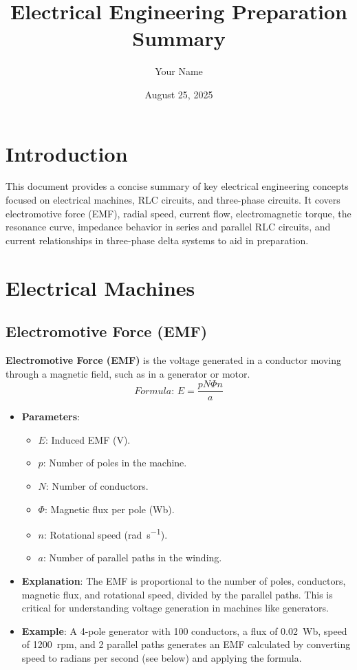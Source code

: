 \documentclass[12pt]{article}
\newcommand{\concept}[1]{\textbf{#1}}
\newcommand{\formula}[1]{\textit{Formula: }#1}
\begin{document}
\title{Electrical Engineering Preparation Summary}
\author{Your Name}
\date{August 25, 2025}
\maketitle

\tableofcontents
\newpage

\section{Introduction}
This document provides a concise summary of key electrical engineering concepts focused on electrical machines, RLC circuits, and three-phase circuits. It covers electromotive force (EMF), radial speed, current flow, electromagnetic torque, the resonance curve, impedance behavior in series and parallel RLC circuits, and current relationships in three-phase delta systems to aid in preparation.

\section{Electrical Machines}
\subsection{Electromotive Force (EMF)}
\concept{Electromotive Force (EMF)} is the voltage generated in a conductor moving through a magnetic field, such as in a generator or motor.
\[
\formula{E = \frac{p N \Phi n}{a}}
\]
\begin{itemize}
    \item \textbf{Parameters}:
        \begin{itemize}
            \item \(E\): Induced EMF (\si{\volt}).
            \item \(p\): Number of poles in the machine.
            \item \(N\): Number of conductors.
            \item \(\Phi\): Magnetic flux per pole (\si{\weber}).
            \item \(n\): Rotational speed (\si{\radian\per\second}).
            \item \(a\): Number of parallel paths in the winding.
        \end{itemize}
    \item \textbf{Explanation}: The EMF is proportional to the number of poles, conductors, magnetic flux, and rotational speed, divided by the parallel paths. This is critical for understanding voltage generation in machines like generators.
    \item \textbf{Example}: A 4-pole generator with 100 conductors, a flux of \SI{0.02}{\weber}, speed of \SI{1200}{rpm}, and 2 parallel paths generates an EMF calculated by converting speed to radians per second (see below) and applying the formula.
\end{itemize}
\end{document}
